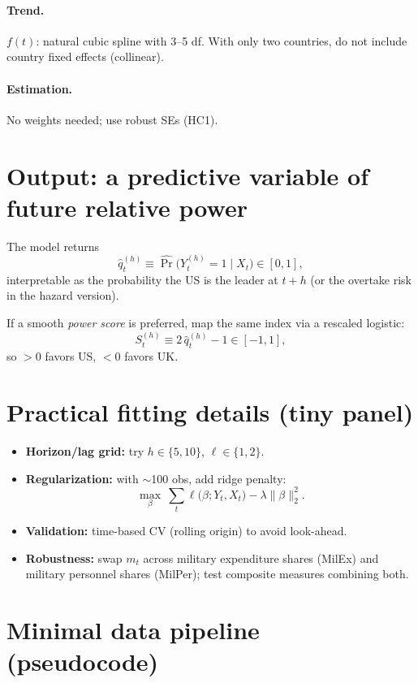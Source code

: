 \documentclass[11pt]{article}
\begin{document}
\paragraph{Trend.}
$f(t)$: natural cubic spline with 3--5 df. With only two countries, do not include country fixed effects (collinear).

\paragraph{Estimation.}
No weights needed; use robust SEs (HC1).

\section{Output: a predictive variable of future relative power}

The model returns
\[
\hat q^{(h)}_t \equiv \widehat{\Pr}\!\big(Y^{(h)}_t=1\mid X_t\big)\in[0,1],
\]
interpretable as the probability the US is the leader at $t+h$ (or the overtake risk in the hazard version).

If a smooth \emph{power score} is preferred, map the same index via a rescaled logistic:
\[
S^{(h)}_t \equiv 2\,\hat q^{(h)}_t - 1 \in [-1,1],
\]
so $>0$ favors US, $<0$ favors UK.

\section{Practical fitting details (tiny panel)}

\begin{itemize}[leftmargin=1.5em]
  \item \textbf{Horizon/lag grid:} try $h\in\{5,10\}$, $\ell\in\{1,2\}$.
  \item \textbf{Regularization:} with $\sim$100 obs, add ridge penalty:
  \[
  \max_{\beta}\ \sum_t \ell\big(\beta;Y_t,X_t\big) - \lambda\|\beta\|_2^2.
  \]
  \item \textbf{Validation:} time-based CV (rolling origin) to avoid look-ahead.
  \item \textbf{Robustness:} swap $m_t$ across military expenditure shares (MilEx) and military personnel shares (MilPer); test composite measures combining both.
\end{itemize}

\section{Minimal data pipeline (pseudocode)}
\end{document}
